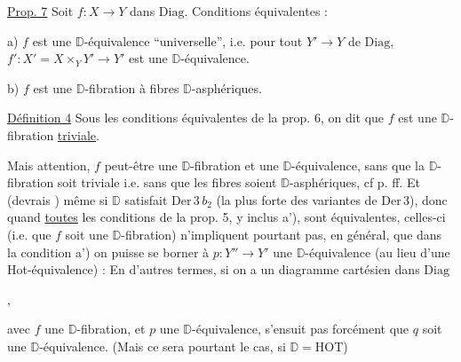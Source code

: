 
\margin{$\unsure{\times|\ast}$}

\uline{Prop. 7} Soit $f:X\longrightarrow Y$ dans $\mathrm{Diag}$. Conditions équivalentes :

a) $f$ est une $\mathbb D$-équivalence ``universelle'', i.e. pour tout $Y'\longrightarrow Y$ de $\mathrm{Diag}$, $f':X'=X\times_Y Y'\longrightarrow Y'$ est une $\mathbb D$-équivalence.

b) $f$ est une $\mathbb D$-fibration à fibres $\mathbb D$-asphériques.

\uline{Définition 4} Sous les conditions équivalentes de la prop. 6, on dit que $f$ est une $\mathbb D$-fibration \uline{triviale}.


Mais attention, $f$ peut-être une $\mathbb D$-fibration et une $\mathbb D$-équivalence, sans que la $\mathbb D$-fibration soit triviale i.e. sans que les fibres soient $\mathbb D$-asphériques, cf p.  ff. Et  (devrais ) même si $\mathbb D$ satisfait $\mathrm{Der}\,3\,b_2$ (la plus forte des variantes de $\mathrm{Der}\,3$), donc quand \uline{toutes} les conditions de la prop. 5, y inclus a'), sont équivalentes, celles-ci (i.e. que $f$ soit une $\mathbb D$-fibration) n'impliquent pourtant pas, en général, que dans la condition a') on puisse se borner à $p:Y''\longrightarrow Y'$ une $\mathbb D$-équivalence (au lieu d'une Hot-équivalence) : En d'autres termes, si on a un diagramme cartésien dans $\mathrm{Diag}$


,

avec $f$ une $\mathbb D$-fibration, et $p$ une $\mathbb D$-équivalence,   s'ensuit pas forcément que $q$ soit une $\mathbb D$-équivalence. (Mais ce sera pourtant le cas,  si $\mathbb D=\mathrm{HOT}$)

